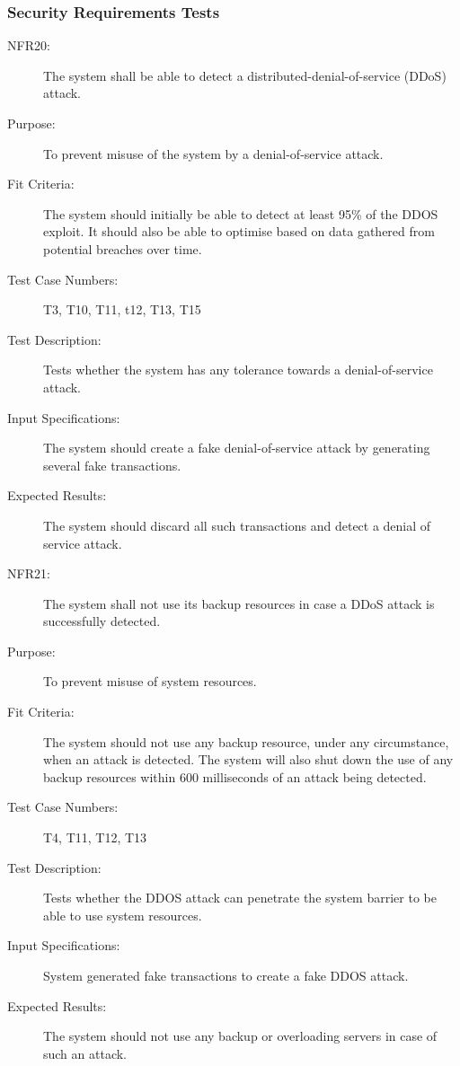 \documentclass[a4paper,twoside,phd]{BYUPhys}
\begin{document}
\subsubsection{Security Requirements Tests}
\begin{description}
\item[NFR20:] The system shall be able to detect a distributed-denial-of-service (DDoS) attack.
\item[Purpose:] To prevent misuse of the system by a denial-of-service attack.
\item[Fit Criteria:] The system should initially be able to detect at least 95\% of the DDOS exploit. It should also be able to optimise based on data gathered from potential breaches over time.
\item[Test Case Numbers:] T3, T10, T11, t12, T13, T15
\item[Test Description:] Tests whether the system has any tolerance towards a denial-of-service attack.
\item[Input Specifications:] The system should create a fake denial-of-service attack by generating several fake transactions.
\item[Expected Results:] The system should discard all such transactions and detect a denial of service attack.

\item[NFR21:] The system shall not use its backup resources in case a DDoS attack is successfully detected.
\item[Purpose:] To prevent misuse of system resources.
\item[Fit Criteria:] The system should not use any backup resource, under any circumstance, when an attack is detected. The system will also shut down the use of any backup resources within 600 milliseconds of an attack being detected.
\item[Test Case Numbers:] T4, T11, T12, T13
\item[Test Description:] Tests whether the DDOS attack can penetrate the system barrier to be able to use system resources.
\item[Input Specifications:] System generated fake transactions to create a fake DDOS attack.
\item[Expected Results:] The system should not use any backup or overloading servers in case of such an attack.


\end{description}
\end{document}
